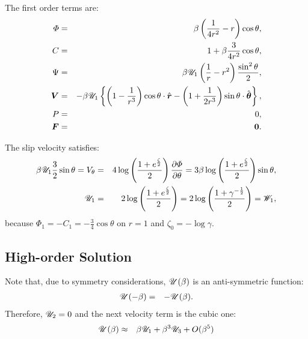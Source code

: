 The first order terms are:
\begin{eqnarray}
\varPhi &=& \beta \left(\frac{1}{4r^2} - r\right)\cos\theta, \\
C &=& 1 + \beta \frac{3}{4r^2} \cos\theta, \\
\Psi &=& \beta \mathscr{U}_1 \left(\frac{1}{r} - r^2\right) \frac{\sin^2\theta}{2}, \\
\boldsymbol{V} &=& -\beta \mathscr{U}_1 \left\{\left(1 - \frac{1}{r^3}\right)\cos\theta \cdot \hat{\boldsymbol{r}} - 
                               \left(1 + \frac{1}{2r^3}\right) \sin\theta \cdot \hat{\boldsymbol{\theta}}\right\}, \\
P &=& 0, \\
\boldsymbol{F} &=& \boldsymbol{0}.
\end{eqnarray}

The slip velocity satisfies:
\begin{eqnarray}
\beta \mathscr{U}_1 \frac{3}{2} \sin\theta =
V_\theta &=& 4 \log \left(\frac{1 + e ^ \frac{\zeta}{2}}{2}\right) \frac{\partial \varPhi}{\partial \theta} 
=
 3 \beta \log \left(\frac{1 + e ^ \frac{\zeta}{2}}{2}\right) \sin\theta, \\
\mathscr{U}_1 &=& 2 \log \left(\frac{1 + e ^ \frac{\zeta}{2}}{2}\right) 
       =  2 \log \left(\frac{1 + \gamma ^ {-\frac{1}{2}}}{2}\right) = \mathscr{W}_1,
\end{eqnarray}
because $\varPhi_1 = -C_1 = -\frac{3}{4} \cos\theta$ on $r=1$
and $\zeta_0 = -\log\gamma$.

\subsection{High-order Solution}
Note that, due to symmetry considerations, $\mathscr{U}(\beta)$ is an anti-symmetric function:
\begin{eqnarray}
\mathscr{U}(-\beta) &=& -\mathscr{U}(\beta).
\end{eqnarray}
Therefore, $\mathscr{U}_2 = 0$ and the next velocity term is the cubic one:
\begin{eqnarray}
\mathscr{U}(\beta) &\approx& \beta \mathscr{U}_1 + \beta^3 \mathscr{U}_3 + O(\beta^5)
\end{eqnarray}

